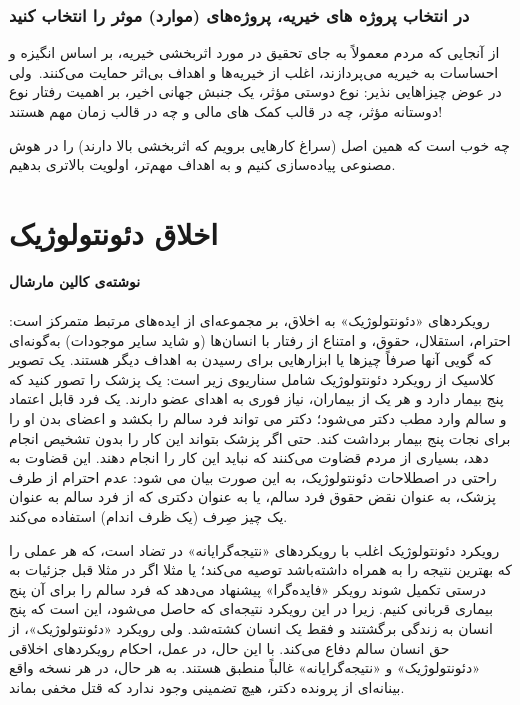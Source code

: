 \subsubsection*{در انتخاب پروژه های خیریه، پروژه‌های (موارد) موثر را انتخاب کنید}
\label{subsubsec:در انتخاب پروژه های خیریه، پروژه‌های (موارد) موثر را انتخاب کنید}
از آنجایی که مردم معمولاً به جای تحقیق در مورد اثربخشی خیریه، بر اساس انگیزه و احساسات به خیریه می‌پردازند، اغلب از خیریه‌ها و اهداف بی‌اثر حمایت می‌کنند.\     ولی در عوض چیزاهایی نذیر: نوع دوستی مؤثر، یک جنبش جهانی اخیر، بر اهمیت رفتار نوع دوستانه مؤثر، چه در قالب کمک های مالی و چه در قالب زمان مهم هستند!

چه خوب است که همین اصل (سراغ کارهایی برویم که اثربخشی بالا دارند) را در هوش مصنوعی پیاده‌سازی کنیم و به اهداف مهم‌تر، اولویت بالاتری بدهیم.


\section*{اخلاق دئونتولوژیک}
\label{sec:اخلاق دئونتولوژیک}
\textbf{نوشته‌ی کالین مارشال}
\paragraph{}
رویکردهای «دئونتولوژیک» به اخلاق، بر مجموعه‌ای از ایده‌های مرتبط متمرکز است: احترام، استقلال، حقوق، و امتناع از رفتار با انسان‌ها (و شاید سایر موجودات) به‌گونه‌ای که گویی آنها صرفاً چیزها یا ابزارهایی برای رسیدن به اهداف دیگر هستند.
یک تصویر کلاسیک از رویکرد دئونتولوژیک شامل سناریوی زیر است: یک پزشک را تصور کنید که پنج بیمار دارد و هر یک از بیماران، نیاز فوری به اهدای عضو دارند.
یک فرد قابل اعتماد و سالم وارد مطب دکتر می‌شود؛ دکتر می تواند فرد سالم را بکشد و اعضای بدن او را برای نجات پنج بیمار برداشت کند.
حتی اگر پزشک بتواند این کار را بدون تشخیص انجام دهد، بسیاری از مردم قضاوت می‌کنند که نباید این کار را انجام دهند.
این قضاوت به راحتی در اصطلاحات دئونتولوژیک، به این صورت بیان می شود: عدم احترام از طرف پزشک، به عنوان نقض حقوق فرد سالم، یا به عنوان دکتری که از فرد سالم به عنوان یک چیز صِرف (یک ظرف اندام) استفاده می‌کند.

رویکرد دئونتولوژیک اغلب با رویکردهای «نتیجه‌گرایانه» در تضاد است، که هر عملی را که بهترین نتیجه را به همراه داشته‌باشد توصیه می‌کند؛ یا مثلا اگر در مثلا قبل جزئیات به درستی تکمیل شوند رویکر «فایده‌گرا» پیشنهاد می‌دهد که فرد سالم را برای آن پنج بیماری قربانی کنیم.
زیرا در این رویکرد نتیجه‌ای که حاصل می‌شود، این است که پنج انسان به زندگی برگشتند و فقط یک انسان کشته‌شد.
ولی رویکرد «دئونتولوژیک»، از حق انسان سالم دفاع می‌کند.
با این حال، در عمل، احکام رویکردهای اخلاقی «دئونتولوژیک» و «نتیجه‌گرایانه» غالباً منطبق هستند.
به هر حال، در هر نسخه واقع بینانه‌ای از پرونده دکتر، هیچ تضمینی وجود ندارد که قتل مخفی بماند.

